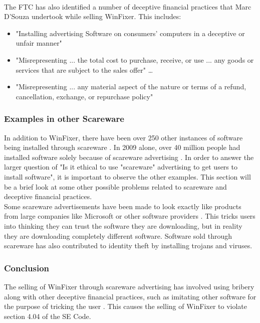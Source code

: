\documentclass[11pt]{article}
\begin{document}
\begin{multicols}{2}
\vspace{10pt}\\
The FTC has also identified a number of deceptive financial practices that Marc D'Souza undertook while selling WinFixer. This includes:
\begin{itemize}
\item "Installing advertising Software on consumers' computers in a deceptive or unfair manner" \cite{ftcorder}
\item "Misrepresenting ... the total cost to purchase, receive, or use ... any goods or services that are subject to the sales offer"\cite{ftcorder} \ldots
\item "Misrepresenting ... any material aspect of the nature or terms of a refund, cancellation, exchange, or repurchase policy"\cite{ftcorder}
\end{itemize}
\subsubsection{Examples in other Scareware}
In addition to WinFixer, there have been over 250 other instances of software being installed through scareware \cite{bbcmillionstricked}. In 2009 alone, over 40 million people had installed software solely because of scareware advertising \cite{bbcmillionstricked}. In order to answer the larger question of "Is it ethical to use "scareware" advertising to get users to install software", it is important to observe the other examples. This section will be a brief look at some other possible problems related to scareware and deceptive financial practices. \\
\vspace{10pt}
Some scareware advertisements have been made to look exactly like products from large companies like Microsoft or other software providers \cite {bbcmillionstricked}. This tricks users into thinking they can trust the software they are downloading, but in reality they are downloading completely different software. Software sold through scareware has also contributed to identity theft by installing trojans and viruses\cite{bbcmillionstricked}.
\subsubsection{Conclusion}
The selling of WinFixer through scareware advertising has involved using bribery along with other deceptive financial practices, such as imitating other software for the purpose of tricking the user \cite{bbcfighting} \cite{ftcorder} \cite{badwarewinfixer}. This causes the selling of WinFixer to violate section 4.04 of the SE Code.



\end{multicols}
\end{document}

